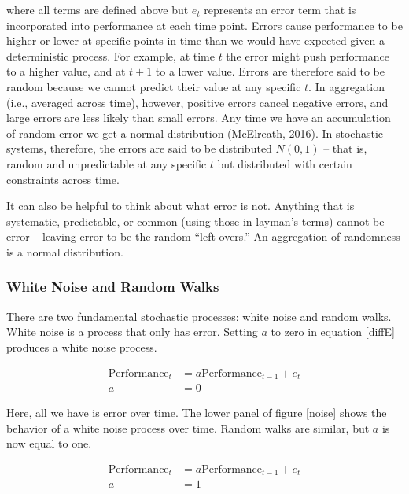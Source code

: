 \documentclass[english,,man]{apa6}
\theoremstyle{definition}
\theoremstyle{definition}
\theoremstyle{definition}
\theoremstyle{remark}
\begin{document}
\noindent where all terms are defined above but \(e_{t}\) represents an
error term that is incorporated into performance at each time point.
Errors cause performance to be higher or lower at specific points in
time than we would have expected given a deterministic process. For
example, at time \(t\) the error might push performance to a higher
value, and at \(t+1\) to a lower value. Errors are therefore said to be
random because we cannot predict their value at any specific \(t\). In
aggregation (i.e., averaged across time), however, positive errors
cancel negative errors, and large errors are less likely than small
errors. Any time we have an accumulation of random error we get a normal
distribution (McElreath, 2016). In stochastic systems, therefore, the
errors are said to be distributed \(N(0, 1)\) -- that is, random and
unpredictable at any specific \(t\) but distributed with certain
constraints across time.

It can also be helpful to think about what error is not. Anything that
is systematic, predictable, or common (using those in layman's terms)
cannot be error -- leaving error to be the random \enquote{left overs.}
An aggregation of randomness is a normal distribution.

\hypertarget{white-noise-and-random-walks}{%
\subsubsection{White Noise and Random
Walks}\label{white-noise-and-random-walks}}

There are two fundamental stochastic processes: white noise and random
walks. White noise is a process that only has error. Setting \(a\) to
zero in equation \ref{diffE} produces a white noise process.

\begin{equation}
\begin{split}
\label{whitenoise}
\textrm{Performance}_{t} &= a \textrm{Performance}_{t-1} + e_{t} \\
a &= 0
\end{split}
\end{equation}

\noindent Here, all we have is error over time. The lower panel of
figure \ref{noise} shows the behavior of a white noise process over
time. Random walks are similar, but \(a\) is now equal to one.

\begin{equation}
\begin{split}
\label{rw}
\textrm{Performance}_{t} &= a \textrm{Performance}_{t-1} + e_{t} \\ 
a &= 1 \\ 
\end{split}
\end{equation}
\end{document}
